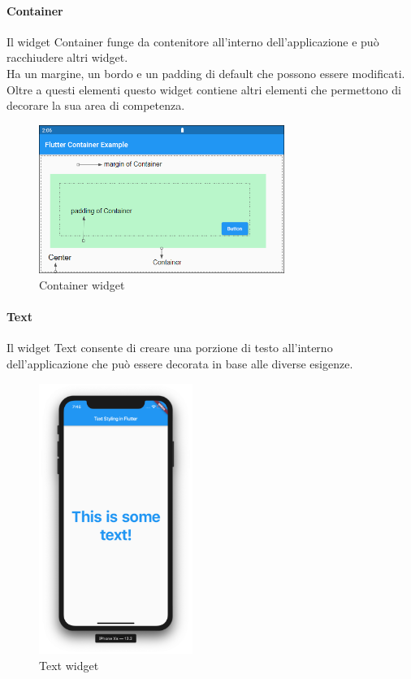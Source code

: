 \newpage

\paragraph{Container}
Il widget Container funge da contenitore all'interno dell'applicazione e può racchiudere altri widget.\\
Ha un margine, un bordo e un padding di default che possono essere modificati.\\
Oltre a questi elementi questo widget contiene altri elementi che permettono di decorare la sua area di competenza.
\begin{figure}[htbp]	
	\centering
	\includegraphics[width=8cm]{immagini/container.png}
	\caption{Container widget}
	\label{fig:Container widget}
\end{figure}

\paragraph{Text}
Il widget Text consente di creare una porzione di testo all'interno dell'applicazione che può essere decorata in base alle diverse esigenze.
\begin{figure}[htbp]	
	\centering
	\includegraphics[width=5cm]{immagini/text.png}
	\caption{Text widget}
	\label{fig:Text widget}
\end{figure}

